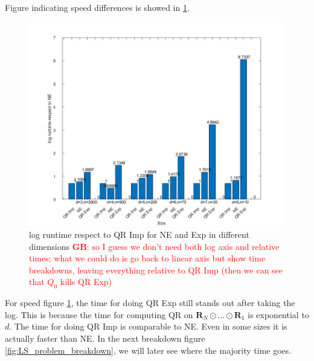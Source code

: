 \documentclass{article}
\newcommand{\mat}[1]{\mathbf{#1}}
\newcommand{\GB}[1]{\textcolor{red}{\textbf{GB}: #1}}
\begin{document}
Figure indicating speed differences is showed in \cref{fig:LS_problem_log}.
\begin{figure}[!ht]
  
  \begin{center}
    \includegraphics*[scale = 0.35]{fig_log_runtime.jpg}
    \caption[Figure]{log runtime respect to QR Imp for NE and Exp in different dimensions \GB{so I guess we don't need both log axis and relative times; what we could do is go back to linear axis but show time breakdowns, leaving everything relative to QR Imp (then we can see that $Q_0$ kills QR Exp)}\label{fig:LS_problem_log}}

  \end{center}
    
\end{figure}

For speed figure \cref{fig:LS_problem_log}, the time for doing QR Exp still stands out after taking the log.
This is because the time for computing QR on $\mat{R}_N \odot \dots \odot \mat{R}_1$ is exponential to $d$.
The time for doing QR Imp is comparable to NE.
Even in some sizes it is actually faster than NE.
In the next breakdown figure \cref{fig:LS_problem_breakdown}, we will later see where the majority time goes.
\end{document}
